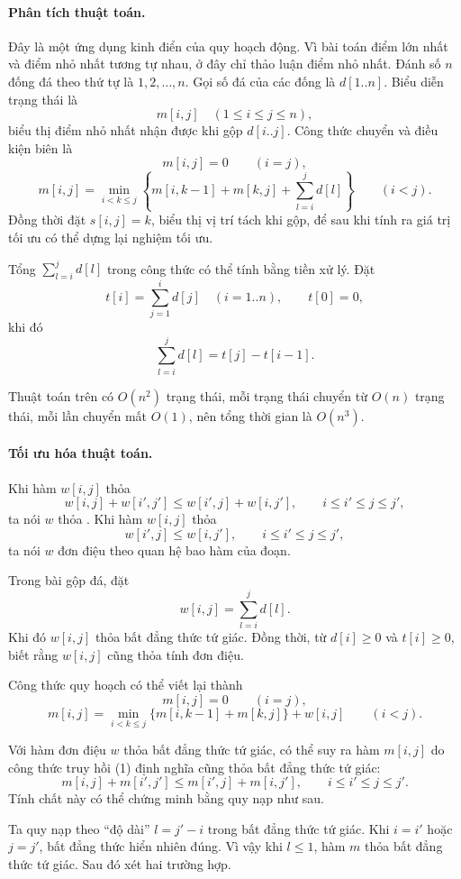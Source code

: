 \documentclass[11pt]{article}
\begin{document}
\paragraph{Phân tích thuật toán.}
Đây là một ứng dụng kinh điển của quy hoạch động. Vì bài toán điểm lớn nhất
và điểm nhỏ nhất tương tự nhau, ở đây chỉ thảo luận điểm nhỏ nhất. Đánh số
\(n\) đống đá theo thứ tự là \(1,2,\ldots,n\). Gọi số đá của các đống là
\(d[1..n]\). Biểu diễn trạng thái là
\[
  m[i,j]\quad (1\le i\le j\le n),
\]
biểu thị điểm nhỏ nhất nhận được khi gộp \(d[i..j]\). Công thức chuyển và
điều kiện biên là
\[
  m[i,j]=0\qquad (i=j),
\]
\[
  m[i,j]=\min_{i<k\le j}
  \left\{m[i,k-1]+m[k,j]+\sum_{l=i}^{j}d[l]\right\}
  \qquad (i<j).
\]
Đồng thời đặt \(s[i,j]=k\), biểu thị vị trí tách khi gộp, để sau khi tính ra
giá trị tối ưu có thể dựng lại nghiệm tối ưu.

Tổng \(\sum_{l=i}^{j}d[l]\) trong công thức có thể tính bằng tiền xử lý. Đặt
\[
  t[i]=\sum_{j=1}^{i}d[j]\quad (i=1..n),\qquad t[0]=0,
\]
khi đó
\[
  \sum_{l=i}^{j}d[l]=t[j]-t[i-1].
\]

Thuật toán trên có \(O(n^2)\) trạng thái, mỗi trạng thái chuyển từ \(O(n)\)
trạng thái, mỗi lần chuyển mất \(O(1)\), nên tổng thời gian là \(O(n^3)\).

\paragraph{Tối ưu hóa thuật toán.}
Khi hàm \(w[i,j]\) thỏa
\[
  w[i,j]+w[i',j']\le w[i',j]+w[i,j'],
  \qquad i\le i'\le j\le j',
\]
ta nói \(w\) thỏa . Khi hàm \(w[i,j]\) thỏa
\[
  w[i',j]\le w[i,j'],\qquad i\le i'\le j\le j',
\]
ta nói \(w\) đơn điệu theo quan hệ bao hàm của đoạn.

Trong bài gộp đá, đặt
\[
  w[i,j]=\sum_{l=i}^{j}d[l].
\]
Khi đó \(w[i,j]\) thỏa bất đẳng thức tứ giác. Đồng thời, từ \(d[i]\ge0\) và
\(t[i]\ge0\), biết rằng \(w[i,j]\) cũng thỏa tính đơn điệu.

Công thức quy hoạch có thể viết lại thành
\[
  m[i,j]=0\qquad (i=j),
\]
\[
  m[i,j]=\min_{i<k\le j}\{m[i,k-1]+m[k,j]\}+w[i,j]\qquad (i<j). \tag{1}
\]

Với hàm đơn điệu \(w\) thỏa bất đẳng thức tứ giác, có thể suy ra hàm
\(m[i,j]\) do công thức truy hồi (1) định nghĩa cũng thỏa bất đẳng thức tứ
giác:
\[
  m[i,j]+m[i',j']\le m[i',j]+m[i,j'],
  \qquad i\le i'\le j\le j'.
\]
Tính chất này có thể chứng minh bằng quy nạp như sau.

Ta quy nạp theo ``độ dài'' \(l=j'-i\) trong bất đẳng thức tứ giác. Khi
\(i=i'\) hoặc \(j=j'\), bất đẳng thức hiển nhiên đúng. Vì vậy khi \(l\le1\),
hàm \(m\) thỏa bất đẳng thức tứ giác. Sau đó xét hai trường hợp.
\end{document}

